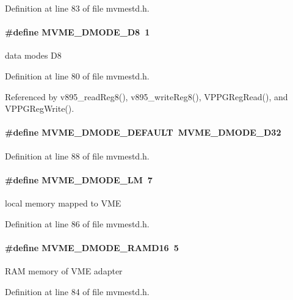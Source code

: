 Definition at line 83 of file mvmestd.h.
\paragraph[{MVME\_\-DMODE\_\-D8}]{\setlength{\rightskip}{0pt plus 5cm}\#define MVME\_\-DMODE\_\-D8~1}\hfill\label{group__mvmestdinclude_ga7e9bd9d8731cf357b74b477d86e3871e}
data modes D8 

Definition at line 80 of file mvmestd.h.

Referenced by v895\_\-readReg8(), v895\_\-writeReg8(), VPPGRegRead(), and VPPGRegWrite().
\paragraph[{MVME\_\-DMODE\_\-DEFAULT}]{\setlength{\rightskip}{0pt plus 5cm}\#define MVME\_\-DMODE\_\-DEFAULT~MVME\_\-DMODE\_\-D32}\hfill\label{group__mvmestdinclude_ga41e0dc98ddaafced795fb252812d6ff4}


Definition at line 88 of file mvmestd.h.
\paragraph[{MVME\_\-DMODE\_\-LM}]{\setlength{\rightskip}{0pt plus 5cm}\#define MVME\_\-DMODE\_\-LM~7}\hfill\label{group__mvmestdinclude_ga9da3a119be8e2aaf29f8858495e6b2b8}
local memory mapped to VME 

Definition at line 86 of file mvmestd.h.
\paragraph[{MVME\_\-DMODE\_\-RAMD16}]{\setlength{\rightskip}{0pt plus 5cm}\#define MVME\_\-DMODE\_\-RAMD16~5}\hfill\label{group__mvmestdinclude_gad828794144a2e8bc886603ec200ae285}
RAM memory of VME adapter 

Definition at line 84 of file mvmestd.h.
